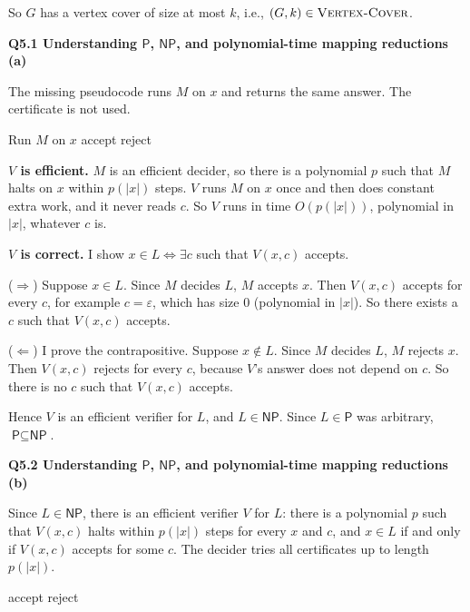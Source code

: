 \documentclass[11pt]{article}
\newcommand{\abs}[1]{\left|#1\right|}
\newcommand{\cproblem}[1]{\textsc{#1}}
\renewcommand{\P}{\textsf{P}}
\newcommand{\NP}{\textsf{NP}}
\newcommand{\VC}{\cproblem{Vertex-Cover}}
\newcommand{\qpage}[1]{\clearpage\noindent\textbf{\large #1}\par\medskip}
\begin{document}
So $G$ has a vertex cover of size at most $k$, i.e., $(G, k) \in \VC$.

\qpage{Q5.1 Understanding $\P$, $\NP$, and polynomial-time mapping reductions (a)}

The missing pseudocode runs $M$ on $x$ and returns the same answer. The certificate is not used.

\begin{algorithmic}[1]
    \State Run $M$ on $x$ 
     \Return accept
    \Else{} \Return reject
    \EndIf
  \EndFunction
\end{algorithmic}

\textbf{$V$ is efficient.}
$M$ is an efficient decider, so there is a polynomial $p$ such that $M$ halts on $x$ within $p(\abs{x})$ steps.
$V$ runs $M$ on $x$ once and then does constant extra work, and it never reads $c$.
So $V$ runs in time $O(p(\abs{x}))$, polynomial in $\abs{x}$, whatever $c$ is.

\textbf{$V$ is correct.} I show $x \in L \iff \exists c$ such that $V(x, c)$ accepts.

($\Longrightarrow$) Suppose $x \in L$.
Since $M$ decides $L$, $M$ accepts $x$.
Then $V(x, c)$ accepts for every $c$, for example $c = \varepsilon$, which has size $0$ (polynomial in $\abs{x}$).
So there exists a $c$ such that $V(x, c)$ accepts.

($\Longleftarrow$) I prove the contrapositive.
Suppose $x \notin L$.
Since $M$ decides $L$, $M$ rejects $x$.
Then $V(x, c)$ rejects for every $c$, because $V$'s answer does not depend on $c$.
So there is no $c$ such that $V(x, c)$ accepts.

Hence $V$ is an efficient verifier for $L$, and $L \in \NP$.
Since $L \in \P$ was arbitrary, $\P \subseteq \NP$.

\qpage{Q5.2 Understanding $\P$, $\NP$, and polynomial-time mapping reductions (b)}

Since $L \in \NP$, there is an efficient verifier $V$ for $L$: there is a polynomial $p$ such that $V(x, c)$ halts within $p(\abs{x})$ steps for every $x$ and $c$, and $x \in L$ if and only if $V(x, c)$ accepts for some $c$.
The decider tries all certificates up to length $p(\abs{x})$.

\begin{algorithmic}[1]
    \For{each string $c$ of length at most $p(\abs{x})$}
       \Return accept
      \EndIf
    \EndFor
    \State \Return reject
  \EndFunction
\end{algorithmic}
\end{document}

